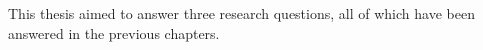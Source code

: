 
This thesis aimed to answer three research questions, all of which have been answered in the previous chapters.

